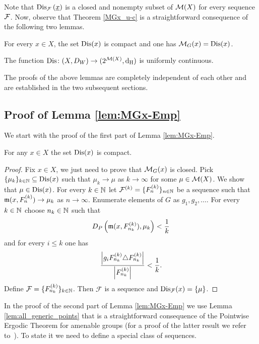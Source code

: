 \noindent
Note that $\operatorname{Dis}_{\operatorname{\mathcal{F}}}\left(\underline{x}\right)$ is a closed and nonempty subset of $\operatorname{\mathcal{M}}(X)$ for every \Folner sequence $\operatorname{\mathcal{F}}$. 
%
Now, observe that Theorem \ref{MGx_u-c} is a straightforward consequence of the following two lemmas.
%
\begin{lem}\label{lem:MGx-Emp}
For every $x\in X$, the set $\operatorname{Dis}(x)$ is compact and one has
$\mathcal{M}_G(x)=\operatorname{Dis}(x)$.
\end{lem}

\begin{lem}\label{lem:Emp_cont}
The function $\operatorname{Dis}\colon (X,D_W)\to (2^{\operatorname{\mathcal{M}}(X)},\operatorname{d_H})$ is uniformly continuous.
\end{lem}



\noindent The proofs of the above lemmas are completely independent of each other and are established in the two subsequent sections.



\subsection*{Proof of Lemma \ref{lem:MGx-Emp}} 

We start with the proof of the first part of Lemma \ref{lem:MGx-Emp}.

\begin{lem}\label{domk}
For any $x\in X$ the set $\operatorname{Dis}(x)$ is compact.
\end{lem} 

\begin{proof}
Fix $x\in X$, we just need to prove that $\operatorname{\mathcal{M}}_G(x)$ is closed.
%
Pick $\{\mu_k\}_{k\in\mathbb{N}}\subseteq\operatorname{Dis}(x)$ such that $\mu_k\to\mu$ as $k\to\infty$ for some $\mu\in\operatorname{\mathcal{M}}(X)$. We show that $\mu\in\operatorname{Dis}(x)$.
%
For every $k\in\mathbb{N}$ let $\mathcal F^{(k)}=\{F^{(k)}_n\}_{n\in\mathbb{N}}$ be a \Folner sequence such that $\operatorname{\mathfrak m}(x,F^{(k)}_n)\to\mu_k$ as $n\to\infty$.
%
Enumerate elements of $G$ as $g_1,g_2,\ldots$.
%
For every $k\in\mathbb{N}$ choose $n_k \in\mathbb{N}$ such that 
\[
D_P\left(\operatorname{\mathfrak m}(x,F^{(k)}_{n_k}),\mu_k\right)<\frac{1}{k}
\]
and for every $i\leq k$ one has 
\[
\frac{\left|g_i F_{n_k}^{(k)}\triangle F_{n_k}^{(k)}\right|}{\left|F_{n_k}^{(k)}\right|}<\frac1k .\]
%
Define $\mathcal F=\{F_{n_k}^{(k)}\}_{k\in\mathbb{N}}$. Then $\mathcal F$ is a \Folner sequence and $\operatorname{Dis}_{\operatorname{\mathcal{F}}}(x)=\{\mu\}$. 
\end{proof}
\noindent 
In the proof of the second part of Lemma \ref{lem:MGx-Emp} we use Lemma \ref{lem:all_generic_points} that is a straightforward consequence of the Pointwise Ergodic Theorem for amenable groups (for a proof of the latter result we refer to~\cite{Lindenstrauss01}). To state it we need to define a special class of \Folner sequences.

